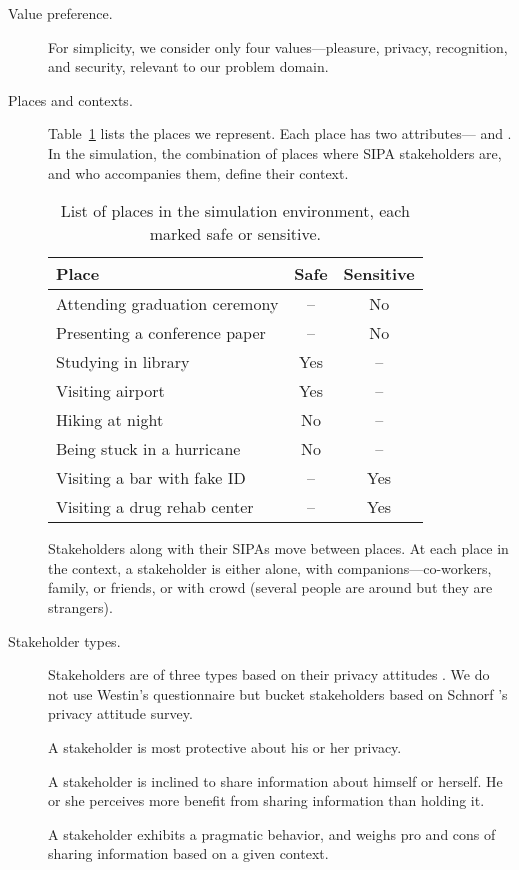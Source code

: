 \begin{description}
\item[Value preference.] For simplicity, we consider only four values---pleasure, privacy, recognition, and security, relevant to our problem domain.  

\item[Places and contexts.]

Table~\ref{tab:places} lists the places we represent. Each place has two attributes--- and . In the simulation, the combination of places where SIPA stakeholders are, and who accompanies them, define their context.

\begin{table}[!htb]
\centering
\caption{List of places in the simulation environment, each marked safe or sensitive.}
\label{tab:places}
\begin{tabular}{lcc}
\toprule
Place & Safe & Sensitive \\\midrule
\rowcolor{lightgray!50!}
Attending graduation ceremony & -- & No \\
Presenting a conference paper & -- & No \\
\rowcolor{lightgray!50!}
Studying in library & Yes & -- \\
Visiting airport & Yes & -- \\
\rowcolor{lightgray!50!}
Hiking at night & No & -- \\
Being stuck in a hurricane & No & -- \\
\rowcolor{lightgray!50!}
Visiting a bar with fake ID & -- & Yes \\
Visiting a drug rehab center & -- & Yes \\
\bottomrule
\end{tabular}
\end{table}

Stakeholders along with their SIPAs move between places. At each place in the context, a stakeholder is either alone, with companions---co-workers, family, or friends, or with crowd (several people are around but they are strangers). 

\item[Stakeholder types.] Stakeholders are of three types based on their privacy attitudes \citep{westin2003social}. 
We do not use Westin's questionnaire but bucket stakeholders based on Schnorf {\etal}'s  privacy attitude survey.

A  stakeholder is most protective about his or her privacy. 

A  stakeholder is inclined to share information about himself or herself. He or she perceives more benefit from sharing information than holding it. 

A  stakeholder exhibits a pragmatic behavior, and weighs pro and cons of sharing information based on a given context. 

\end{description}

